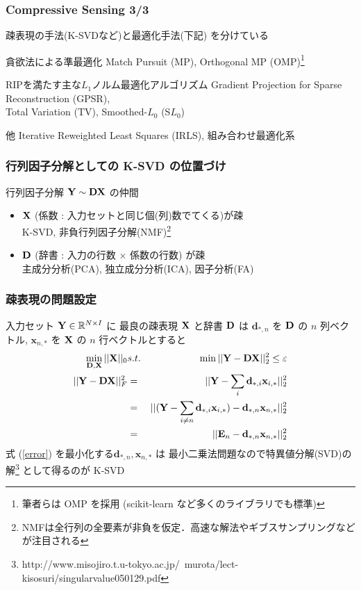 \begin{frame}\frametitle{Compressive Sensing 3/3}
疎表現の手法(K-SVDなど)と最適化手法(下記) を分けている
\begin{block}{貪欲法による準最適化}
        Match Pursuit (MP),
        Orthogonal MP (OMP)\footnote{筆者らは OMP を採用 (scikit-learn など多くのライブラリでも標準)}
\end{block}
\begin{block}{RIPを満たす主な$L_1$ノルム最適化アルゴリズム}
        Gradient Projection for Sparse Reconstruction (GPSR),\\
        Total Variation (TV),
        Smoothed-$L_0$ (S$L_0$)
\end{block}
\begin{block}{他}
Iterative Reweighted Least Squares (IRLS), 組み合わせ最適化系
\end{block}
\end{frame}


\begin{frame}\frametitle{行列因子分解としての K-SVD の位置づけ}
行列因子分解 ${\mathbf{Y}} \sim {\mathbf{D}} {\mathbf{X}}$ の仲間 \cite{Murata2012}
\begin{itemize}
  \item ${\mathbf{X}}$ (係数 : 入力セットと同じ個(列)数でてくる)が疎\\
    K-SVD, 非負行列因子分解(NMF)\footnote{NMFは全行列の全要素が非負を仮定．高速な解法やギブスサンプリングなどが注目される}
  \item ${\mathbf{D}}$ (辞書 : 入力の行数 $\times$ 係数の行数) が疎\\
    主成分分析(PCA), 独立成分分析(ICA), 因子分析(FA)
\end{itemize}
\end{frame}


\begin{frame}\frametitle{疎表現の問題設定}
\label{ksvd}
入力セット ${\mathbf{Y}} \in {\mathbb{R}^{N\times I}}$ に
最良の疎表現 ${\mathbf{X}}$ と辞書 ${\mathbf{D}}$ は
$\mathbf{d}_{*,n}$ を ${\mathbf{D}}$ の $n$ 列ベクトル,
$\mathbf{x}_{n,*}$ を ${\mathbf{X}}$ の $n$ 行ベクトルとすると
\begin{eqnarray}
    \min_{{\mathbf{D}}, {\mathbf{X}}} ||{\mathbf{X}}||_0
    &s.t.& \min ||{\mathbf{Y}}-{\mathbf{D}}{\mathbf{X}}||^2_2 \leq \varepsilon \\
    ||{\mathbf{Y}}-{\mathbf{D}}{\mathbf{X}}||^2_F &=&
    ||{\mathbf{Y}} - \sum_{i} \mathbf{d}_{*,i} \mathbf{x}_{i,*}||^2_2 \\
    &=& ||({\mathbf{Y}} - \sum_{i \neq n} \mathbf{d}_{*,i} \mathbf{x}_{i,*}) - \mathbf{d}_{*,n} \mathbf{x}_{n,*}||^2_2 \\
    &=& ||\mathbf{E}_n - \mathbf{d}_{*,n} \mathbf{x}_{n,*}||^2_2 \label{error}
\end{eqnarray}
式 (\ref{error}) を最小化する$\mathbf{d}_{*,n}, \mathbf{x}_{n,*}$ は
最小二乗法問題なので特異値分解(SVD)の解\footnote{http://www.misojiro.t.u-tokyo.ac.jp/~murota/lect-kisosuri/singularvalue050129.pdf}
として得るのが K-SVD
\end{frame}


